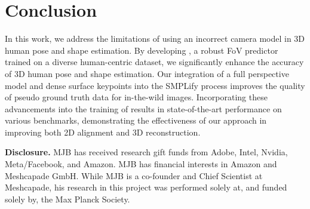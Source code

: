 \section{Conclusion}

In this work, we address the limitations of using an incorrect camera model in 3D human pose and shape estimation. By developing \cameramodel, a robust FoV predictor trained on a diverse human-centric dataset, we significantly enhance the accuracy of 3D human pose and shape estimation. Our integration of a full perspective model and dense surface keypoints into the SMPLify process improves the quality of pseudo ground truth data for in-the-wild images. Incorporating these advancements into the training of \hpsmodel results in state-of-the-art performance on various benchmarks, demonstrating the effectiveness of our approach in improving both 2D alignment and 3D reconstruction.

{\small \noindent\textbf{Disclosure.}
MJB has received research gift funds from Adobe, Intel, Nvidia, Meta/Facebook, and Amazon.  MJB has financial interests in Amazon and Meshcapade GmbH.  While MJB is a co-founder and Chief Scientist at Meshcapade, his research in this project was performed solely at, and funded solely by, the Max Planck Society.
}

